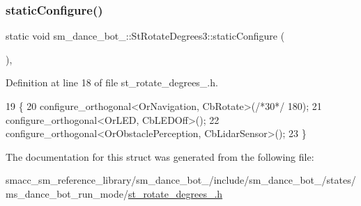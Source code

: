 \subsubsection{\texorpdfstring{static\+Configure()}{staticConfigure()}}
{\footnotesize\ttfamily static void sm\+\_\+dance\+\_\+bot\+\_\+::\+St\+Rotate\+Degrees3\+::static\+Configure (\begin{DoxyParamCaption}{ }\end{DoxyParamCaption})\hspace{0.3cm}{\ttfamily [inline]}, {\ttfamily [static]}}



Definition at line 18 of file st\+\_\+rotate\+\_\+degrees\+\_.\+h.


\begin{DoxyCode}
19   \{
20     configure\_orthogonal<OrNavigation, CbRotate>(\textcolor{comment}{/*30*/} 180);
21     configure\_orthogonal<OrLED, CbLEDOff>();
22     configure\_orthogonal<OrObstaclePerception, CbLidarSensor>();
23   \}
\end{DoxyCode}


The documentation for this struct was generated from the following file\+:\begin{DoxyCompactItemize}
\item 
smacc\+\_\+sm\+\_\+reference\+\_\+library/sm\+\_\+dance\+\_\+bot\+\_/include/sm\+\_\+dance\+\_\+bot\+\_/states/ms\+\_\+dance\+\_\+bot\+\_\+run\+\_\+mode/\hyperlink{2_2include_2sm__dance__bot__2_2states_2ms__dance__bot__run__mode_2st__rotate__degrees__3_8h}{st\+\_\+rotate\+\_\+degrees\+\_.\+h}\end{DoxyCompactItemize}

